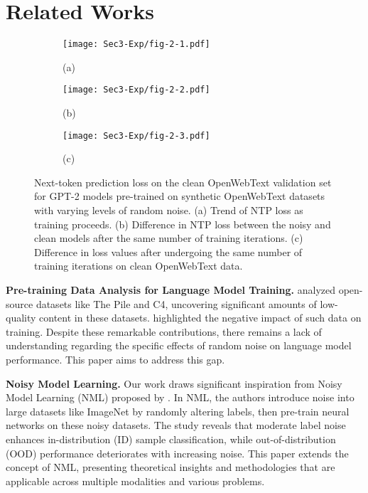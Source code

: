 \section{Related Works}
\label{sec:2}

\begin{figure*}[ht]
  \centering
  \begin{subfigure}{0.3\linewidth}
    \texttt{[image: Sec3-Exp/fig-2-1.pdf]}
    \caption*{(a)}
  \end{subfigure} \hfill
  \begin{subfigure}{0.3\linewidth}
    \texttt{[image: Sec3-Exp/fig-2-2.pdf]}
    \caption*{(b)}
  \end{subfigure} \hfill
  \begin{subfigure}{0.35\linewidth}
    \texttt{[image: Sec3-Exp/fig-2-3.pdf]}
    \caption*{(c)}
  \end{subfigure}
  \vspace*{-2.5mm}
  \caption{Next-token prediction loss on the clean OpenWebText validation set for GPT-2 models pre-trained on synthetic OpenWebText datasets with varying levels of random noise. (a) Trend of NTP loss as training proceeds. (b) Difference in NTP loss between the noisy and clean models after the same number of training iterations. (c) Difference in loss values after undergoing the same number of training iterations on clean OpenWebText data.}
  \label{fig:2}
  \vspace*{-4.5mm}
\end{figure*}

\textbf{Pre-training Data Analysis for Language Model Training.} \citet{wimbd} analyzed open-source datasets like The Pile and C4, uncovering significant amounts of low-quality content in these datasets. \citet{allenphysics, colmmc} highlighted the negative impact of such data on training. Despite these remarkable contributions, there remains a lack of understanding regarding the specific effects of random noise on language model performance. This paper aims to address this gap.

\textbf{Noisy Model Learning.} Our work draws significant inspiration from Noisy Model Learning (NML) proposed by \citet{nml}. In NML, the authors introduce noise into large datasets like ImageNet by randomly altering labels, then pre-train neural networks on these noisy datasets. The study reveals that moderate label noise enhances in-distribution (ID) sample classification, while out-of-distribution (OOD) performance deteriorates with increasing noise. This paper extends the concept of NML, presenting theoretical insights and methodologies that are applicable across multiple modalities and various problems.

